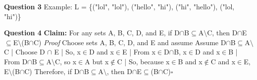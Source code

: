 \documentclass{article}
\begin{document}
\newline\newline\newline

\textbf{Question 3}\newline
Example: L = \{("lol", "lol"), ("hello", "hi"), ("hi", "hello"), ("lol, "hi")\}\newline\newline

\textbf{Question 4}\newline
\textbf{Claim: } For any sets A, B, C, D, and E, if D$\cap$B$\subseteq$A$\setminus$C, then D$\cap$E$\subseteq$E$\setminus$(B$\cap$C)\newline\newline
\textit{Proof}\newline
Choose sets A, B, C, D, and E and assume Assume D$\cap$B$\subseteq$A$\setminus$C\newline
|	Choose D $\cap$ E\newline
|	So, x$\in$D and x$\in$E\newline
|	From x$\in$D$\cap$B, x$\in$D and x$\in$B\newline
|	From D$\cap$B$\subseteq$A$\setminus$C, so x$\in$A but x$\notin$C\newline
|	So, because x$\in$B and x$\notin$C and x$\in$E, E$\setminus$(B$\cap$C)\newline
Therefore, if D$\cap$B$\subseteq$A$\setminus$, then D$\cap$E$\subseteq$(B$\cap$C)$\square$\newline\newline
\end{document}
